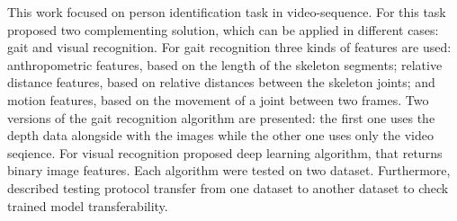 \documentclass[a4paper,twoside,11pt]{article}
\numberwithin{equation}{section}
\begin{document}
This work focused on person identification task in video-sequence. For this task proposed two complementing solution, which can be applied in different cases: gait and visual recognition. For gait recognition three kinds of features are used: anthropometric features, based on the length of the skeleton segments; relative distance features, based on relative distances between the skeleton joints; and motion features, based on the movement of a joint between two frames. Two versions of the gait recognition algorithm are presented: the first one uses the depth data alongside with the images while the other one uses only the video seqience. For visual recognition proposed deep learning algorithm, that returns binary image features. Each algorithm were tested on two dataset. Furthermore, described testing protocol transfer from one dataset to another dataset to check trained model transferability.
\end{document}
